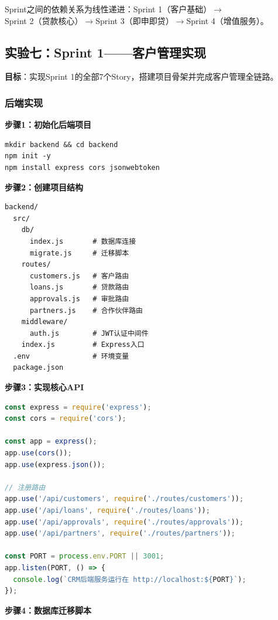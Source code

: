 Sprint之间的依赖关系为线性递进：Sprint 1（客户基础）$\to$Sprint 2（贷款核心）$\to$Sprint 3（即申即贷）$\to$Sprint 4（增值服务）。

\subsection{实验七：Sprint 1——客户管理实现}

\textbf{目标}：实现Sprint 1的全部7个Story，搭建项目骨架并完成客户管理全链路。

\subsubsection*{后端实现}

\textbf{步骤1：初始化后端项目}

\begin{lstlisting}[style=shell]
mkdir backend && cd backend
npm init -y
npm install express cors jsonwebtoken
\end{lstlisting}

\textbf{步骤2：创建项目结构}

\begin{lstlisting}[style=shell]
backend/
  src/
    db/
      index.js       # 数据库连接
      migrate.js     # 迁移脚本
    routes/
      customers.js   # 客户路由
      loans.js       # 贷款路由
      approvals.js   # 审批路由
      partners.js    # 合作伙伴路由
    middleware/
      auth.js        # JWT认证中间件
    index.js         # Express入口
  .env               # 环境变量
  package.json
\end{lstlisting}

\textbf{步骤3：实现核心API}

\begin{lstlisting}[language=JavaScript]
const express = require('express');
const cors = require('cors');

const app = express();
app.use(cors());
app.use(express.json());

// 注册路由
app.use('/api/customers', require('./routes/customers'));
app.use('/api/loans', require('./routes/loans'));
app.use('/api/approvals', require('./routes/approvals'));
app.use('/api/partners', require('./routes/partners'));

const PORT = process.env.PORT || 3001;
app.listen(PORT, () => {
  console.log(`CRM后端服务运行在 http://localhost:${PORT}`);
});
\end{lstlisting}

\textbf{步骤4：数据库迁移脚本}

